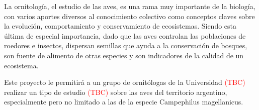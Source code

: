 La ornitología, el estudio de las aves, es una rama muy importante de la biología, con varios aportes diversos al conocimiento colectivo como conceptos claves sobre la evolución, comportamiento y conservamiento de ecosistemas. Siendo esta última de especial importancia, dado que las aves controlan las poblaciones de roedores e insectos, dispersan semillas que ayuda a la conservación de bosques, son fuente de alimento de otras especies y son indicadores de la calidad de un ecosistema.

Este proyecto le permitirá a un grupo de ornitólogas de la Universidad \textcolor{red}{(TBC)} realizar un tipo de estudio \textcolor{red}{(TBC)} sobre las aves del territorio argentino, especialmente pero no limitado a las de la especie Campephilus magellanicus.